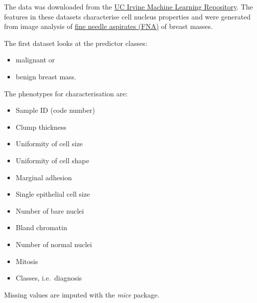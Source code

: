 \documentclass[]{article}
\providecommand{\tightlist}{%
  \setlength{\itemsep}{0pt}\setlength{\parskip}{0pt}}
\begin{document}
The data was downloaded from the
\href{http://archive.ics.uci.edu/ml/datasets/Breast+Cancer+Wisconsin+\%28Diagnostic\%29}{UC
Irvine Machine Learning Repository}. The features in these datasets
characterise cell nucleus properties and were generated from image
analysis of
\href{https://en.wikipedia.org/wiki/Fine-needle_aspiration}{fine needle
aspirates (FNA)} of breast masses.

The first dataset looks at the predictor classes:

\begin{itemize}
\tightlist
\item
  malignant or
\item
  benign breast mass.
\end{itemize}

The phenotypes for characterisation are:

\begin{itemize}
\tightlist
\item
  Sample ID (code number)
\item
  Clump thickness
\item
  Uniformity of cell size
\item
  Uniformity of cell shape
\item
  Marginal adhesion
\item
  Single epithelial cell size
\item
  Number of bare nuclei
\item
  Bland chromatin
\item
  Number of normal nuclei
\item
  Mitosis
\item
  Classes, i.e.~diagnosis
\end{itemize}

Missing values are imputed with the \emph{mice} package.
\end{document}
